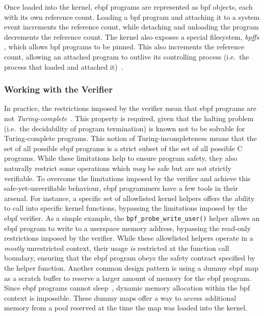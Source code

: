 Once loaded into the kernel, \gls{ebpf} programs are represented as \gls{bpf} objects, each with its
own reference count. Loading a \gls{bpf} program and attaching it to a system event increments
the reference count, while detaching and unloading the program decrements the reference
count. The kernel also exposes a special filesystem, \textit{bpffs} , which allows \gls{bpf}
programs to be pinned. This also increments the reference count, allowing an attached
program to outlive its controlling process (i.e.~the process that loaded and attached
it)~\cite{gregg2019_bpf}.

\subsubsection*{Working with the Verifier}

In practice, the restrictions imposed by the verifier mean that \gls{ebpf} programs are not
\textit{Turing-complete}~\cite{gregg2019_bpf}.  This property is required, given that the
halting problem (i.e.~the decidability of program termination) is known not to be solvable
for Turing-complete programs. This notion of Turing-incompleteness means that the set of
all possible \gls{ebpf} programs is a strict subset of the set of all possible C programs. While
these limitations help to ensure program safety, they also naturally restrict some
operations which \textit{may} be safe but are not strictly verifiable. To overcome the
limitations imposed by the verifier and achieve this safe-yet-unverifiable behaviour, \gls{ebpf}
programmers have a few tools in their arsenal. For instance, a specific set of allowlisted
kernel helpers offers the ability to call into specific kernel functions, bypassing the
limitations imposed by the \gls{ebpf} verifier. As a simple example, the
\texttt{bpf\_probe\_write\_user()} helper allows an \gls{ebpf} program to write to a userspace
memory address, bypassing the read-only restrictions imposed by the verifier. While these
allowlisted helpers operate in a \textit{mostly} unrestricted context, their usage
\textit{is} restricted at the function call boundary, ensuring that the \gls{ebpf} program obeys
the safety contract specified by the helper function.  Another common design pattern is
using a dummy \gls{ebpf} map as a scratch buffer to reserve a larger amount of memory for the
\gls{ebpf} program.  Since \gls{ebpf} programs cannot sleep~\cite{gregg2019_bpf}, dynamic memory
allocation within the \gls{bpf} context is impossible. These dummy maps offer a way to access
additional memory from a pool reserved at the time the map was loaded into the kernel.

